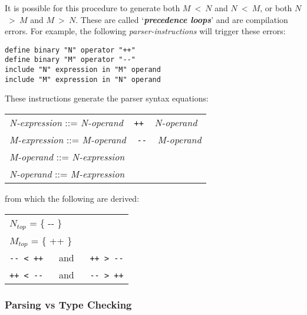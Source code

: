 \documentclass[12pt]{article}
\newcommand{\skey}[2]{{\bf \em #1#2}\index{#1}}
\newenvironment{indpar}[1][0.3in]%
	{\begin{list}{}%
		     {\setlength{\itemsep}{0in}%
		      \setlength{\topsep}{0in}%
		      \setlength{\parsep}{1ex}%
		      \setlength{\labelwidth}{#1}%
		      \setlength{\leftmargin}{#1}%
		      \addtolength{\leftmargin}{\labelsep}}%
	 \item}%
	{\end{list}}
\begin{document}
It is possible for this procedure to generate
both $M$~<~$N$ and $N$~<~$M$, or
both $N$~>~$M$ and $M$~>~$N$.
These are called `\skey{precedence loop}s' and are
compilation errors.  For example, the following
{\em parser-instructions} will trigger these errors:
\begin{indpar}\begin{verbatim}
define binary "N" operator "++"
define binary "M" operator "--"
include "N" expression in "M" operand
include "M" expression in "N" operand
\end{verbatim}\end{indpar}
These instructions generate the parser syntax equations:
\begin{center}
\begin{tabular}{l}
{\em N-expression} ::= {\em N-operand} ~ {\tt ++} ~ {\em N-operand} \\
{\em M-expression} ::= {\em M-operand} ~ {\tt -{}-} ~ {\em M-operand} \\
{\em M-operand} ::= {\em N-expression} \\
{\em N-operand} ::= {\em M-expression} \\
\end{tabular}
\end{center}
from which the following are derived:
\begin{center}
\begin{tabular}{l}
$N_{top}$ = \{ -{}- \} \\
$M_{top}$ = \{ +{}+ \} \\
{\tt -{}- < ++} ~~ and ~~ {\tt ++ > -{}-} \\
{\tt ++ < -{}-} ~~ and ~~ {\tt -{}- > ++} \\
\end{tabular}
\end{center}

\subsubsection{Parsing vs Type Checking}
\end{document}
